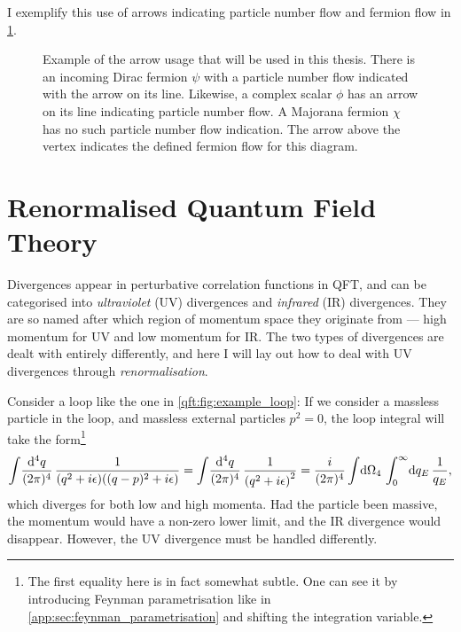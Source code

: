 \documentclass[../main.tex]{subfiles}
\begin{document}
I exemplify this use of arrows indicating particle number flow and fermion flow in \cref{qft:fig:feynman_flow}.

\begin{figure}[ht!]
  \centering
  \caption{Example of the arrow usage that will be used in this thesis.
    There is an incoming Dirac fermion \(\psi\) with a particle number flow indicated with the arrow on its line.
    Likewise, a complex scalar \(\phi\) has an arrow on its line indicating particle number flow.
    A Majorana fermion \(\chi\) has no such particle number flow indication.
    The arrow above the vertex indicates the defined fermion flow for this diagram.}
  \label{qft:fig:feynman_flow}
\end{figure}




\section{Renormalised Quantum Field Theory}


Divergences appear in perturbative correlation functions in QFT, and can be
categorised into \emph{ultraviolet} (UV) divergences and \emph{infrared} (IR)
divergences. They are so named after which region of momentum space they
originate from --- high momentum for UV and low momentum for IR\@. The two types
of divergences are dealt with entirely differently, and here I will lay out how
to deal with UV divergences through \emph{renormalisation}.
\medskip

Consider a loop like the one in \cref{qft:fig:example_loop}:
If we consider a massless particle in the loop, and massless external particles \(p^2 = 0\), the loop integral will take the form\footnote{The first equality here is in fact somewhat subtle. One can see it by introducing Feynman parametrisation like in \cref{app:sec:feynman_parametrisation} and shifting the integration variable.}
\begin{equation}
  \label{qft:eq:example_loop}
  \loopintegral[4]{q} \frac{1}{(q^2+i\epsilon)((q-p)^2+i\epsilon)} = \loopintegral[4]{q} \frac{1}{\pclosed{q^2 + i\epsilon}^2} =
  \frac{i}{(2\pi)^4} \integral{\Omega_4} \integral[_0^\infty]{q_E}
  \frac{1}{q_E},
\end{equation}
which diverges for both low and high momenta.  Had the particle been
massive, the momentum would have a non-zero lower limit, and the IR divergence
would disappear.
However, the UV divergence must be handled differently.
\end{document}
